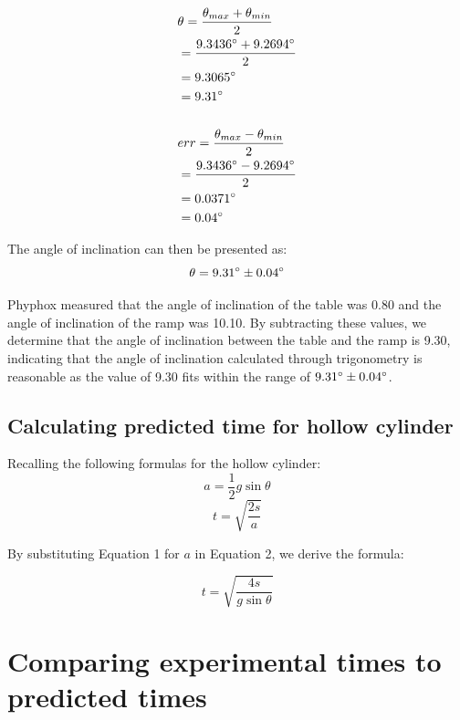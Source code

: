 \documentclass[letterpaper, 12pt]{article}
\begin{document}
\begin{align*}
     & \theta = \frac{\theta_{max} + \theta_{min}}{2}
    \\
     & = \frac{9.3436\degree + 9.2694\degree}{2}
    \\
     & = 9.3065\degree
    \\
     & = 9.31\degree
    \\
    \\
     & err = \frac{\theta_{max} - \theta_{min}}{2}
    \\
     & = \frac{9.3436\degree - 9.2694\degree}{2}
    \\
     & = 0.0371\degree
    \\
     & = 0.04\degree
\end{align*}

The angle of inclination can then be presented as:
$$
    \theta = 9.31\degree \pm 0.04\degree
$$

Phyphox measured that the angle of inclination of the table was 0.80\degree
and the angle of inclination of the ramp was 10.10\degree. By subtracting
these values, we determine that the angle of inclination between the table
and the ramp is 9.30\degree, indicating that the angle of inclination
calculated through trigonometry is reasonable as the value of 9.30\degree
fits within the range of $9.31\degree \pm 0.04\degree$.

\subsection{Calculating predicted time for hollow cylinder}

Recalling the following formulas for the hollow cylinder:
\begin{equation}
    a = \frac{1}{2}g\sin\theta
\end{equation}
\begin{equation}
    t = \sqrt{\frac{2s}{a}}
\end{equation}

By substituting Equation 1 for $a$ in Equation 2, we derive the formula:

$$
    t = \sqrt{\frac{4s}{g\sin\theta}}
$$

\section{Comparing experimental times to predicted times}
\end{document}
